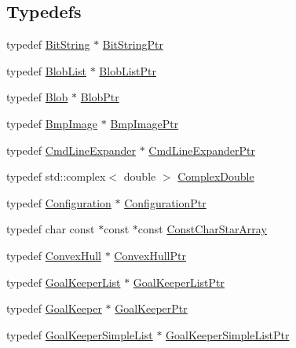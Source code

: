 \subsection*{Typedefs}
\begin{DoxyCompactItemize}
\item 
typedef \hyperlink{class_k_k_b_1_1_bit_string}{Bit\+String} $\ast$ \hyperlink{namespace_k_k_b_a9236416b9881803383623e31488bbf85}{Bit\+String\+Ptr}
\item 
typedef \hyperlink{class_k_k_b_1_1_blob_list}{Blob\+List} $\ast$ \hyperlink{namespace_k_k_b_a43f0fcfaef97a91bc290134c9a407d4d}{Blob\+List\+Ptr}
\item 
typedef \hyperlink{class_k_k_b_1_1_blob}{Blob} $\ast$ \hyperlink{namespace_k_k_b_a4fa91a7788b982654fca9d7319b98cb4}{Blob\+Ptr}
\item 
typedef \hyperlink{class_k_k_b_1_1_bmp_image}{Bmp\+Image} $\ast$ \hyperlink{namespace_k_k_b_a94f37925e0d532e2bc225a4ba64270cf}{Bmp\+Image\+Ptr}
\item 
typedef \hyperlink{class_k_k_b_1_1_cmd_line_expander}{Cmd\+Line\+Expander} $\ast$ \hyperlink{namespace_k_k_b_a6f834b5d389de3052a60ab4e17a6e626}{Cmd\+Line\+Expander\+Ptr}
\item 
typedef std\+::complex$<$ double $>$ \hyperlink{namespace_k_k_b_a307e28915a31eb2034af6cb1d0d5fb88}{Complex\+Double}
\item 
typedef \hyperlink{class_k_k_b_1_1_configuration}{Configuration} $\ast$ \hyperlink{namespace_k_k_b_a7c58cf710b445e0fb89e66f37dda5fde}{Configuration\+Ptr}
\item 
typedef char const $\ast$const $\ast$const \hyperlink{namespace_k_k_b_adfacaca3337ea9de79ba008a19aba556}{Const\+Char\+Star\+Array}
\item 
typedef \hyperlink{class_k_k_b_1_1_convex_hull}{Convex\+Hull} $\ast$ \hyperlink{namespace_k_k_b_a2cd041adc87da43384dfd9d283df8676}{Convex\+Hull\+Ptr}
\item 
typedef \hyperlink{class_k_k_b_1_1_goal_keeper_list}{Goal\+Keeper\+List} $\ast$ \hyperlink{namespace_k_k_b_a0b1032cb0aabc82f3f39875869101414}{Goal\+Keeper\+List\+Ptr}
\item 
typedef \hyperlink{class_k_k_b_1_1_goal_keeper}{Goal\+Keeper} $\ast$ \hyperlink{namespace_k_k_b_ae74d71076d6a6eb363f18a563ac0785a}{Goal\+Keeper\+Ptr}
\item 
typedef \hyperlink{class_k_k_b_1_1_goal_keeper_simple_list}{Goal\+Keeper\+Simple\+List} $\ast$ \hyperlink{namespace_k_k_b_a4883048cbce42bdc9472fb46ae43463f}{Goal\+Keeper\+Simple\+List\+Ptr}

\end{DoxyCompactItemize}
